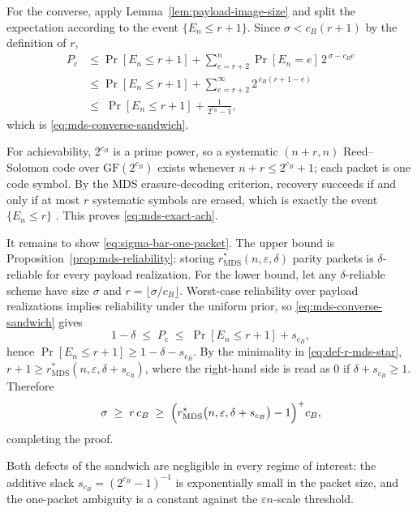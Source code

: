 \documentclass[journal]{IEEEtran}
\makeatletter
\numberwithin{equation}{section}
\renewenvironment{proof}[1][\proofname]{\par
  \pushQED{\qed}%
  \normalfont \topsep6\p@\@plus6\p@\relax
  \trivlist
  \item[\hskip\labelsep
        \itshape
    #1\@addpunct{.}]\ignorespaces
}{%
  \popQED\endtrivlist\@endpefalse
}
\makeatother
\begin{document}
\begin{proof}
For the converse, apply Lemma~\ref{lem:payload-image-size} and split the
expectation according to the event \(\{E_n\le r+1\}\).  Since
\(\sigma<c_B(r+1)\) by the definition of \(r\),
\begin{align}
  P_{\mathrm c}
  &\le
  \Pr[E_n\le r+1]
  +
  \sum_{e=r+2}^{n}
  \Pr[E_n=e]\,2^{\,\sigma-c_B e}
  \nonumber\\
  &\le
  \Pr[E_n\le r+1]
  +
  \sum_{e=r+2}^{\infty}2^{\,c_B(r+1-e)} \nonumber\\
  &\le\;
  \Pr[E_n\le r+1]
  +
  \frac{1}{2^{c_B}-1},
\label{eq:geometric-tail}
\end{align}
which is \eqref{eq:mds-converse-sandwich}.

For achievability, \(2^{c_B}\) is a prime power, so a systematic
\((n+r,n)\) Reed--Solomon code over \(\mathrm{GF}(2^{c_B})\) exists whenever
\(n+r\le 2^{c_B}+1\); each packet is one code symbol.  By the MDS
erasure-decoding criterion, recovery succeeds if and only if at most \(r\)
systematic symbols are erased, which is exactly the event \(\{E_n\le r\}\)
\cite{singleton1964maximum,macwilliams1977theory}.  This proves
\eqref{eq:mds-exact-ach}.

It remains to show \eqref{eq:sigma-bar-one-packet}.  The upper bound is
Proposition~\ref{prop:mds-reliability}: storing
\(r_{\mathrm{MDS}}^*(n,\varepsilon,\delta)\) parity packets is
\(\delta\)-reliable for every payload realization.  For the lower bound, let
any \(\delta\)-reliable scheme have size \(\sigma\) and
\(r=\lfloor\sigma/c_B\rfloor\).  Worst-case reliability over payload
realizations implies reliability under the uniform prior, so
\eqref{eq:mds-converse-sandwich} gives
\[
  1-\delta
  \;\le\;
  P_{\mathrm c}
  \;\le\;
  \Pr[E_n\le r+1]+s_{c_B},
\]
hence
\(\Pr[E_n\le r+1]\ge 1-\delta-s_{c_B}\).  By the minimality in
\eqref{eq:def-r-mds-star},
\(r+1\ge r_{\mathrm{MDS}}^*(n,\varepsilon,\delta+s_{c_B})\), where the
right-hand side is read as \(0\) if \(\delta+s_{c_B}\ge 1\).  Therefore
\[
  \sigma
  \;\ge\;
  r\,c_B
  \;\ge\;
  \Bigl(
    r_{\mathrm{MDS}}^*\bigl(n,\varepsilon,\delta+s_{c_B}\bigr)-1
  \Bigr)^{+}c_B,
\]
completing the proof.
\end{proof}

Both defects of the sandwich are negligible in every regime of interest: the
additive slack \(s_{c_B}=(2^{c_B}-1)^{-1}\) is exponentially small in the
packet size, and the one-packet ambiguity is a constant against the
\(\varepsilon n\)-scale threshold.
\end{document}
